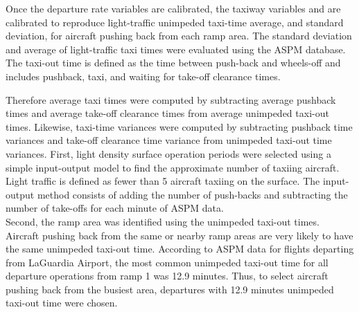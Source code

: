 \documentclass[letterpaper]{article}
\begin{document}
Once the departure rate variables are calibrated, the taxiway variables  and  are calibrated to reproduce light-traffic unimpeded taxi-time average, and standard deviation, for aircraft pushing back from each ramp area. The standard deviation and average of light-traffic taxi times were evaluated using the ASPM database. The taxi-out time is defined as the time between push-back and wheels-off and includes pushback, taxi, and waiting for take-off clearance times. 
\iffalse
In addition, ASPM data provide unimpeded taxi out times, i.e. times it takes for aircraft to transit from pushback to take-off when the taxiway system is empty and aircraft can travel directly to the runway threshold. The unimpeded taxi-out times are defined by the FAA as ``the estimated Taxi Out Time for an aircraft by carrier under optimal operating conditions (when congestion, weather, or other delay factors are not significant). This number is estimated by calendar year and season for each carrier and airport reporting ASQP and ARINC data'' \cite{faa2010}. These times depend on the ramp area from which aircraft have pushed back. 
They are computed by the FAA as follow: ``first, the unimpeded taxi-out time is redefined in terms of available data as the taxi-out time when the departure queue is equal to one and the arrival queue is equal to zero. Then, a linear regression of the
observed taxi-out times with the observed departure and arrival queues is conducted, and the unimpeded
taxi-out time is estimated from this equation by setting the departure queue equal to 1 and arrival queue
equal to 0'' \cite{Simaiakis2009}. 
\fi
Therefore average taxi times were computed by subtracting average pushback times and average take-off clearance times from average unimpeded taxi-out times. Likewise, taxi-time variances were computed by subtracting pushback time variances and take-off clearance time variance from unimpeded taxi-out time variances.
\iffalse
\indent First, light density surface operation periods were selected using a simple input-output model to find the approximate number of 
taxiing aircraft. Light traffic is defined as fewer than 5 aircraft taxiing on the surface. The input-output method consists of adding the 
number of push-backs and subtracting the number of take-offs for each minute of ASPM data.\\
\indent Second, the ramp area was identified using the unimpeded taxi-out times. Aircraft pushing back from the same or nearby ramp areas are very likely to have the same unimpeded taxi-out time. According to ASPM data for flights departing from LaGuardia Airport, the most common unimpeded taxi-out time for all departure operations from ramp 1 was 12.9 minutes. Thus, to select aircraft pushing back from the busiest area, departures with 12.9 minutes unimpeded taxi-out time were chosen.\\
\end{document}
